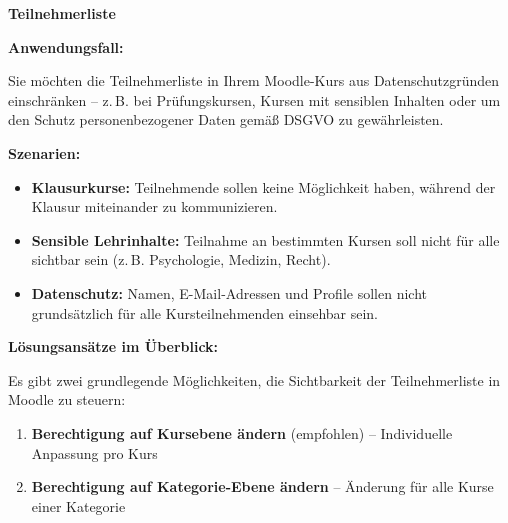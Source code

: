 \documentclass{article}
\newlength{\commonwidth}
\begin{document}
\begin{center}
\textbf{\textcolor{customred}{\LARGE Teilnehmerliste \faUsers{}}}
\end{center}

\vspace{0.5cm}

\begin{center}
\begin{minipage}{\commonwidth}
\begin{mdframed}[backgroundcolor=lightgray, linewidth=0pt, roundcorner=5pt]
\textbf{Anwendungsfall:}

Sie möchten die Teilnehmerliste in Ihrem Moodle-Kurs aus Datenschutzgründen einschränken -- z.\,B. bei Prüfungskursen, Kursen mit sensiblen Inhalten oder um den Schutz personenbezogener Daten gemäß DSGVO zu gewährleisten.

\vspace{0.3cm}

\textbf{Szenarien:}
\begin{itemize}
  \item \textbf{Klausurkurse:} Teilnehmende sollen keine Möglichkeit haben, während der Klausur miteinander zu kommunizieren.
  \item \textbf{Sensible Lehrinhalte:} Teilnahme an bestimmten Kursen soll nicht für alle sichtbar sein (z.\,B. Psychologie, Medizin, Recht).
  \item \textbf{Datenschutz:} Namen, E-Mail-Adressen und Profile sollen nicht grundsätzlich für alle Kursteilnehmenden einsehbar sein.
\end{itemize}
\end{mdframed}
\end{minipage}
\end{center}

\vspace{0.8cm}

\textbf{Lösungsansätze im Überblick:}

Es gibt zwei grundlegende Möglichkeiten, die Sichtbarkeit der Teilnehmerliste in Moodle zu steuern:

\begin{enumerate}
  \item \textbf{Berechtigung auf Kursebene ändern} (empfohlen) -- Individuelle Anpassung pro Kurs
  \item \textbf{Berechtigung auf Kategorie-Ebene ändern} -- Änderung für alle Kurse einer Kategorie
\end{enumerate}
\end{document}
